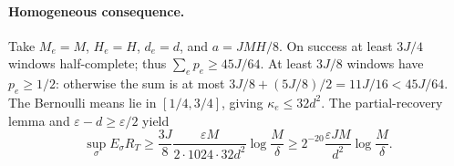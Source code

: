 \paragraph{Homogeneous consequence.}
Take $M_e=M$, $H_e=H$, $d_e=d$, and $a=JMH/8$. On success at least $3J/4$
windows half-complete; thus $\sum_ep_e\ge45J/64$. At least $3J/8$ windows
have $p_e\ge1/2$: otherwise the sum is at most
$3J/8+(5J/8)/2=11J/16<45J/64$.
The Bernoulli means lie in $[1/4,3/4]$, giving $\kappa_e\le32d^2$.
The partial-recovery lemma and $\varepsilon-d\ge\varepsilon/2$ yield
\[
 \sup_\sigma E_\sigma R_T\ge
 \frac{3J}{8}\frac{\varepsilon M}{2\cdot1024\cdot32d^2}
             \log\frac M\delta
 \ge2^{-20}\frac{\varepsilon JM}{d^2}\log\frac M\delta.
\]
